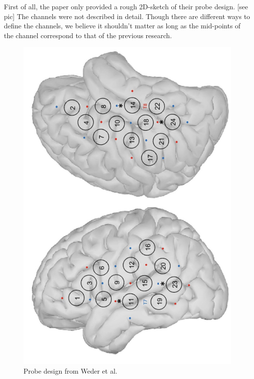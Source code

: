 First of all, the paper only provided a rough 2D-sketch of their probe design. [see pic] The channels were not described in detail. Though there are different ways to define the channels, we believe it shouldn't matter as long as the mid-points of the channel correspond to that of the previous research.

\begin{figure}[H]
  \centering
    \includegraphics[scale= 0.4]{bilder/weder_probe.jpg}
  \caption{Probe design from Weder et al.}
  \label{fig:somesignal}
\end{figure}

